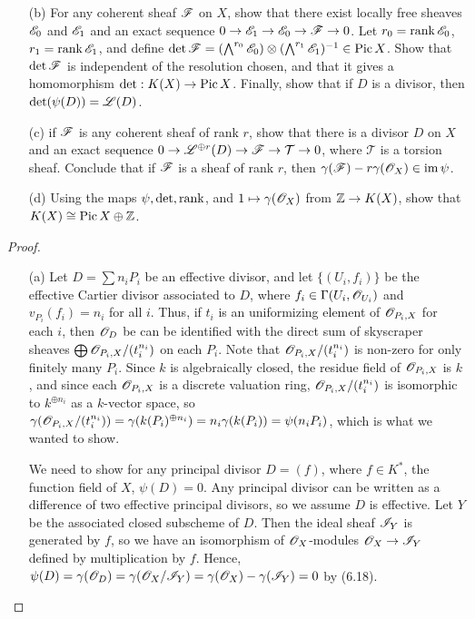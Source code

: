 \documentclass{article}
\begin{document}
\begin{enumerate} [label=\textbf{\arabic*.}, leftmargin=0em]
\begin{itemize}
    \item[(b)] For any coherent sheaf $\mathscr{F}$ on $X$, show that there exist locally free sheaves $\mathscr{E}_0$ and $\mathscr{E}_1$ and an exact sequence $0 \to \mathscr{E}_1 \to \mathscr{E}_0 \to \mathscr{F} \to 0$. Let $r_0 = \operatorname{rank} \mathscr{E}_0$, $r_1 = \operatorname{rank} \mathscr{E}_1$, and define $\det \mathscr{F} = (\bigwedge^{r_0} \mathscr{E}_0) \otimes (\bigwedge^{r_1} \mathscr{E}_1)^{-1} \in \operatorname{Pic} X$. Show that $\det \mathscr{F}$ is independent of the resolution chosen, and that it gives a homomorphism $\det : K(X) \to \operatorname{Pic} X$. Finally, show that if $D$ is a divisor, then $\det(\psi(D)) = \mathscr{L}(D)$.

    \item[(c)] if $\mathscr{F}$ is any coherent sheaf of rank $r$, show that there is a divisor $D$ on $X$ and an exact sequence $0 \to \mathscr{L}^{\oplus r}(D) \to \mathscr{F} \to \mathcal{T} \to 0$, where $\mathcal{T}$ is a torsion sheaf. Conclude that if $\mathscr{F}$ is a sheaf of rank $r$, then $\gamma(\mathscr{F}) - r \gamma(\mathscr{O}_X) \in \operatorname{im} \psi$.

    \item[(d)] Using the maps $\psi, \det, \operatorname{rank}$, and $1 \mapsto \gamma(\mathscr{O}_X)$ from $\mathbb{Z} \to K(X)$, show that $K(X) \cong \operatorname{Pic} X \oplus \mathbb{Z}$. 
\end{itemize}

\begin{proof} $ $ \vspace{0pt}
\begin{itemize}
\item[(a)] Let $D = \sum n_i P_i$ be an effective divisor, and let $\{ (U_i, f_i) \}$ be the effective Cartier divisor associated to $D$, where $f_i \in \Gamma(U_i, \mathscr{O}_{U_i})$ and $v_{P_i}(f_i) = n_i$ for all $i$. Thus, if $t_i$ is an uniformizing element of $\mathscr{O}_{P_i, X}$ for each $i$, then $\mathscr{O}_D$ be can be identified with the direct sum of skyscraper sheaves $\bigoplus \mathscr{O}_{P_i, X} / (t_i^{n_i})$ on each $P_i$. Note that $ \mathscr{O}_{P_i, X} / (t_i^{n_i})$ is non-zero for only finitely many $P_i$. Since $k$ is algebraically closed, the residue field of $\mathscr{O}_{P_i, X}$ is $k$, and since each $\mathscr{O}_{P_i, X}$ is a discrete valuation ring, $\mathscr{O}_{P_i, X} / (t_i^{n_i})$ is isomorphic to $k^{\oplus n_i}$ as a $k$-vector space, so $\gamma(\mathscr{O}_{P_i, X}/(t_i^{n_i})) = \gamma(k(P_i)^{\oplus n_i}) = n_i \gamma(k(P_i)) = \psi(n_iP_i)$, which is what we wanted to show. 

We need to show for any principal divisor $D = (f)$, where $f \in K^*$, the function field of $X$, $\psi(D) = 0$. Any principal divisor can be written as a difference of two effective principal divisors, so we assume $D$ is effective. Let $Y$ be the associated closed subscheme of $D$. Then the ideal sheaf $\mathscr{I}_Y$ is generated by $f$, so we have an isomorphism of $\mathscr{O}_X$-modules $\mathscr{O}_X \to \mathscr{I}_Y$ defined by multiplication by $f$. Hence, $\psi(D) = \gamma(\mathscr{O}_D) = \gamma(\mathscr{O}_X / \mathscr{I}_Y) = \gamma(\mathscr{O}_X) - \gamma(\mathscr{I}_Y) = 0$ by (6.18).


\end{itemize}
\end{proof}
\end{enumerate}
\end{document}
